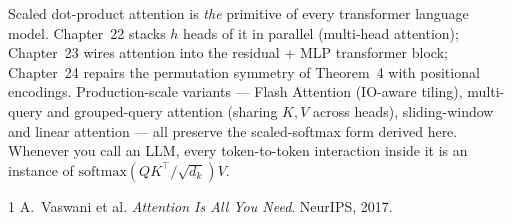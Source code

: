 Scaled dot-product attention is \emph{the} primitive of every transformer language model. Chapter~22 stacks $h$ heads of it in parallel (multi-head attention); Chapter~23 wires attention into the residual + MLP transformer block; Chapter~24 repairs the permutation symmetry of Theorem~4 with positional encodings. Production-scale variants --- Flash Attention (IO-aware tiling), multi-query and grouped-query attention (sharing $K,V$ across heads), sliding-window and linear attention --- all preserve the scaled-softmax form derived here. Whenever you call an LLM, every token-to-token interaction inside it is an instance of $\mathrm{softmax}(QK^\top/\sqrt{d_k})V$.

\begin{thebibliography}{1}
 A.~Vaswani et al. \emph{Attention Is All You Need}. NeurIPS, 2017.
\end{thebibliography}
